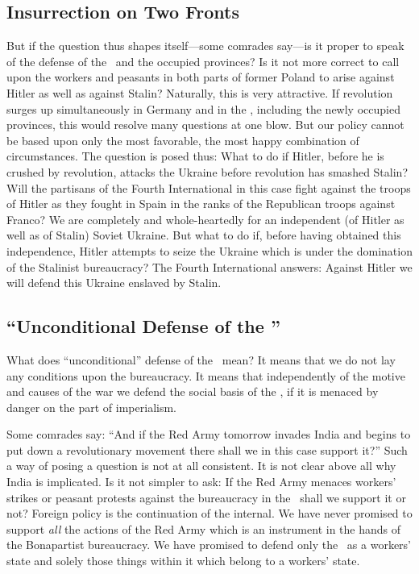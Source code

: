 \subsection*{Insurrection on Two Fronts}

But if the question thus shapes itself---some comrades say---is it proper to speak of the defense of the \USSR\ and the occupied provinces? Is it not more correct to call upon the workers and peasants in both parts of former Poland to arise against Hitler as well as against Stalin? Naturally, this is very attractive. If revolution surges up simultaneously in Germany and in the \USSR, including the newly occupied provinces, this would resolve many questions at one blow. But our policy cannot be based upon only the most favorable, the most happy combination of circumstances. The question is posed thus: What to do if Hitler, before he is crushed by revolution, attacks the Ukraine before revolution has smashed Stalin? Will the partisans of the Fourth International in this case fight against the troops of Hitler as they fought in Spain in the ranks of the Republican troops against Franco? We are completely and whole-heartedly for an independent (of Hitler as well as of Stalin) Soviet Ukraine. But what to do if, before having obtained this independence, Hitler attempts to seize the Ukraine which is under the domination of the Stalinist bureaucracy? The Fourth International answers: Against Hitler we will defend this Ukraine enslaved by Stalin.

\subsection*{“Unconditional Defense of the \USSR”}

What does “unconditional” defense of the \USSR\ mean? It means that we do not lay any conditions upon the bureaucracy. It means that independently of the motive and causes of the war we defend the social basis of the \USSR, if it is menaced by danger on the part of imperialism.

Some comrades say: “And if the Red Army tomorrow invades India and begins to put down a revolutionary movement there shall we in this case support it?” Such a way of posing a question is not at all consistent. It is not clear above all why India is implicated. Is it not simpler to ask: If the Red Army menaces workers’ strikes or peasant protests against the bureaucracy in the \USSR\ shall we support it or not? Foreign policy is the continuation of the internal. We have never promised to support \emph{all} the actions of the Red Army which is an instrument in the hands of the Bonapartist bureaucracy. We have promised to defend only the \USSR\ as a workers’ state and solely those things within it which belong to a workers’ state.

